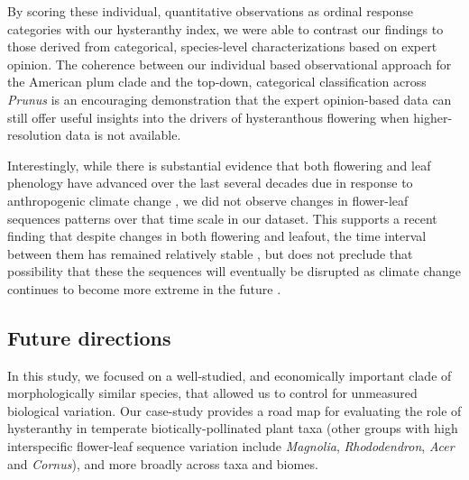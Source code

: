\documentclass{article}[12pt]
\begin{document}
{%

By scoring these individual, quantitative observations as ordinal response categories with our hysteranthy index, we were able to contrast our findings to those derived from categorical, species-level characterizations based on expert opinion. The coherence between our individual based observational approach for the American plum clade and the top-down, categorical classification across \emph{Prunus} is an encouraging demonstration that the expert opinion-based data can still offer useful insights into the drivers of hysteranthous flowering when higher-resolution data is not available. 

Interestingly, while there is substantial evidence that both flowering and leaf phenology have advanced over the last several decades due in response to anthropogenic climate change \citep{Menzel2006,Cleland2007,Augspurger:2020aa}, we did not observe changes in flower-leaf sequences patterns over that time scale in our dataset. This supports a recent finding that despite changes in both flowering and leafout, the time interval between them has remained relatively stable \citep{}, but does not preclude that possibility that these the sequences will eventually be disrupted as climate change continues to become more extreme in the future \citep{}.

\subsection*{Future directions}

In this study, we focused on a well-studied, and economically important clade of morphologically similar species, that allowed us to control for unmeasured biological variation. Our case-study provides a road map for evaluating the role of hysteranthy in temperate biotically-pollinated plant taxa (other groups with high interspecific flower-leaf sequence variation include \emph{Magnolia}, \emph{Rhododendron}, \emph{Acer} and \emph{Cornus}), and more broadly across taxa and biomes.

}
\end{document}
